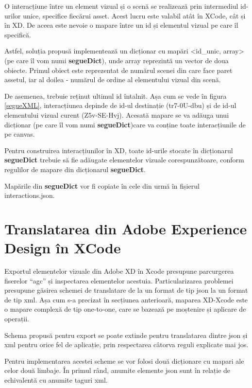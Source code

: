 

O interacțiune între un element vizual și o scenă se realizează prin intermediul id-urilor unice, specifice fiecărui asset. Acest lucru este valabil atât în XCode, cât și în XD. De aceea este nevoie o mapare între un id și elementul vizual pe care îl specifică. 

Astfel, soluția propusă implementează un dicționar cu mapări <id_unic, array> (pe care îl vom numi \textbf{segueDict}), unde array reprezintă un vector de doua obiecte. Primul obiect este reprezentat de numărul scenei din care face paret assetul, iar al doilea - numărul de ordine al elementului vizual din scenă.

De asemenea, trebuie reținut ultimul id întalnit. Așa cum se vede în figura \ref{segueXML}, interacțiunea depinde de id-ul destinație (tr7-0U-dbu) și de id-ul elementului vizual curent (Z5v-SE-Hvj). Acesată mapare se va adăuga unui dicționar (pe care îl vom numi \textbf{segueDict})care va conține toate interacțiunile de pe canvas.

Pentru construirea interacțiunilor în XD, toate id-urile stocate în dicționarul \textbf{segueDict} trebuie să fie adăugate elementelor vizuale corespunzătoare, conform regulilor de mapare din dicționarul \textbf{segueDict}.

Mapările din \textbf{segueDict} vor fi copiate în cele din urmă în fișierul interactions.json.

\section{Translatarea din Adobe Experience Design în XCode}

Exportul elementelor vizuale din Adobe XD în Xcode presupune parcurgerea fiserelor “agc”  și inspectarea elementelor acestuia. Particularizarea problemei presupune găsirea schemei de translatare de la un format de tip json la un format de tip xml. Așa cum s-a precizat în secțiunea anterioară, maparea XD-Xcode este o mapare complexă de tip one-to-one, care se bazează pe moștenire și  aplicare de operații. 

Schema propusă pentru export se poate extinde pentru translatarea dintre json și xml pentru orice fel de aplicație, prin respectarea câtorva reguli explicate mai jos. 

Pentru implementarea acestei scheme se vor folosi două dicționare cu mapari ale celor două limbaje.  În primul rând, anumite elemente json sunt în relație de echivalentă cu anumite taguri xml. 


